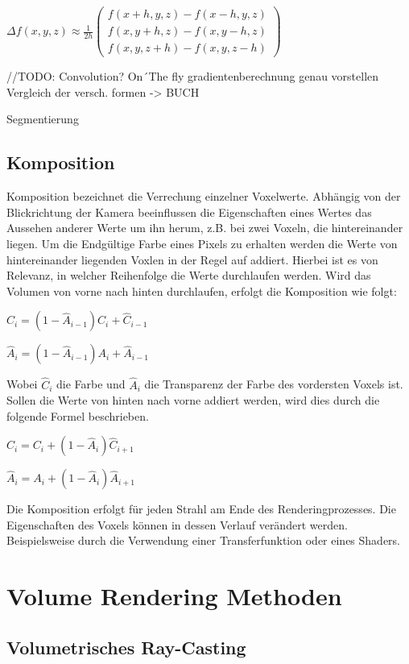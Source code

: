 $
\Delta f(x,y,z)\approx \frac{1}{2h}
\left ( \begin{matrix}
f(x + h, y, z) - f(x - h, y, z)\\ 
f(x, y + h, z) - f(x, y - h, z)\\ 
f(x, y, z + h) - f(x, y, z - h)
\end{matrix} \right )
$

//TODO:
Convolution?
On´The fly gradientenberechnung
genau vorstellen
Vergleich der versch. formen -> BUCH

Segmentierung

\subsection{Komposition}

Komposition bezeichnet die Verrechung einzelner Voxelwerte. Abhängig von der Blickrichtung der Kamera beeinflussen die Eigenschaften eines Wertes das Aussehen anderer Werte um ihn herum, z.B. bei zwei Voxeln, die hintereinander liegen. Um die Endgültige Farbe eines Pixels zu erhalten werden die Werte von hintereinander liegenden Voxlen in der Regel auf addiert. Hierbei ist es von Relevanz, in welcher Reihenfolge die Werte durchlaufen werden. Wird das Volumen von vorne nach hinten durchlaufen, erfolgt die Komposition wie folgt:

$\hat{C}_{i}=(1-\hat{A}_{i-1})C_{i}+\hat{C}_{i-1}$

$\hat{A}_{i}=(1-\hat{A}_{i-1})A_{i}+\hat{A}_{i-1}$

Wobei $\hat{C}_{i}$ die Farbe und $\hat{A}_{i}$ die Transparenz der Farbe des vordersten Voxels ist.
Sollen die Werte von hinten nach vorne addiert werden, wird dies durch die folgende Formel beschrieben.

$\hat{C}_{i}=C_{i}+(1-\hat{A}_{i})\hat{C}_{i+1}$

$\hat{A}_{i}=A_{i}+(1-\hat{A}_{i})\hat{A}_{i+1}$

Die Komposition erfolgt für jeden Strahl am Ende des Renderingprozesses. Die Eigenschaften des Voxels können in dessen Verlauf verändert werden. Beispielsweise durch die Verwendung einer Transferfunktion oder eines Shaders.


\section{Volume Rendering Methoden}

\subsection{Volumetrisches Ray-Casting}
\label{rayCasting}

